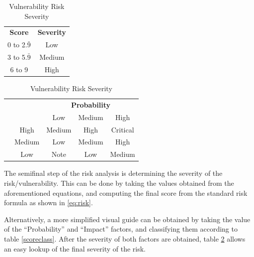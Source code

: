 \documentclass[a4paper,12pt]{article}
\begin{document}
	\begin{table}[!htbp]
		\begin{minipage}{.4\linewidth}
			\centering
			\begin{tabular}{cc}
				{\bf Score} & {\bf Severity} \\
				0 to 2.$\bar{9}$ & \cellcolor[HTML]{FCFF2F}Low \\
				3 to 5.$\bar{9}$ & \cellcolor[HTML]{F8A102}Medium \\
				6 to 9 & \cellcolor[HTML]{FE0000}High
			\end{tabular}
			\caption{Score Classification}
			\label{scoreclass}
		\end{minipage}
		\begin{minipage}{.6\linewidth}
			\centering
			\begin{tabular}{ccccc}
				\multicolumn{1}{l}{} & \multicolumn{1}{l}{} & \multicolumn{3}{c}{{\bf Probability}} \\
				\multicolumn{1}{l}{} &  & \cellcolor[HTML]{EFEFEF}Low & \cellcolor[HTML]{C0C0C0}Medium & \cellcolor[HTML]{9B9B9B}High \\
				& \cellcolor[HTML]{9B9B9B}High & \cellcolor[HTML]{F8A102}Medium & \cellcolor[HTML]{FE0000}High & \cellcolor[HTML]{FFCCC9}Critical \\
				& \cellcolor[HTML]{C0C0C0}Medium & \cellcolor[HTML]{FCFF2F}Low & \cellcolor[HTML]{F8A102}Medium & \cellcolor[HTML]{FE0000}High \\
				\multirow{-3}{*}{\rotatebox[origin=c]{90}{\bf Impact}} & \cellcolor[HTML]{EFEFEF}Low & \cellcolor[HTML]{34FF34}Note & \cellcolor[HTML]{FCFF2F}Low & \cellcolor[HTML]{F8A102}Medium
			\end{tabular}
			\caption{Vulnerability Risk Severity}
			\label{vulnrisksever}
		\end{minipage}
	\end{table}
	
	The semifinal step of the risk analysis is determining the severity of the risk/vulnerability. This can be done by taking the values obtained from the aforementioned equations, and computing the final score from the standard risk formula as shown in \ref{eq:risk}.
	
	Alternatively, a more simplified visual guide can be obtained by taking the value of the ``Probability'' and ``Impact'' factors, and classifying them according to table \ref{scoreclass}. After the severity of both factors are obtained, table \ref{vulnrisksever} allows an easy lookup of the final severity of the risk.
	
\end{document}
